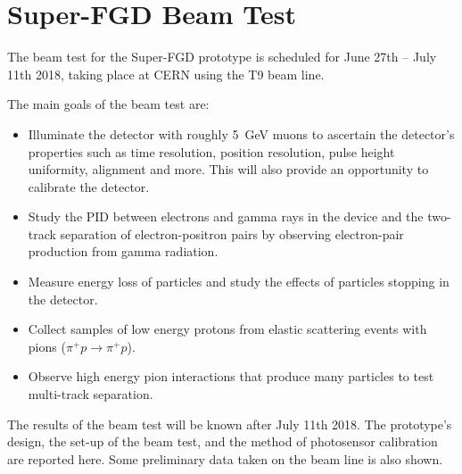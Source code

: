 \documentclass[aps,pra,12pt,notitlepage,tightenlines]{revtex4-1}
\begin{document}
\section{Super-FGD Beam Test}
\label{sec:sfgd}
The beam test for the Super-FGD prototype is scheduled for June 27th -- July 11th 2018, taking place at CERN using the T9 beam line.

The main goals of the beam test are:
\begin{itemize}
 \item Illuminate the detector with roughly 5~GeV muons to ascertain the detector's properties such as time resolution, position resolution, pulse height uniformity, alignment and more. This will also provide an opportunity to calibrate the detector.
 \item Study the PID between electrons and gamma rays in the device and the two-track separation of electron-positron pairs by observing electron-pair production from gamma radiation.
 \item Measure energy loss of particles and study the effects of particles stopping in the detector.
 \item Collect samples of low energy protons from elastic scattering events with pions ($\pi^+ p \rightarrow \pi^+ p$).
 \item Observe high energy pion interactions that produce many particles to test multi-track separation.
\end{itemize}

The results of the beam test will be known after July 11th 2018. The prototype's design, the set-up of the beam test, and the method of photosensor calibration are reported here. Some preliminary data taken on the beam line is also shown.
\end{document}
